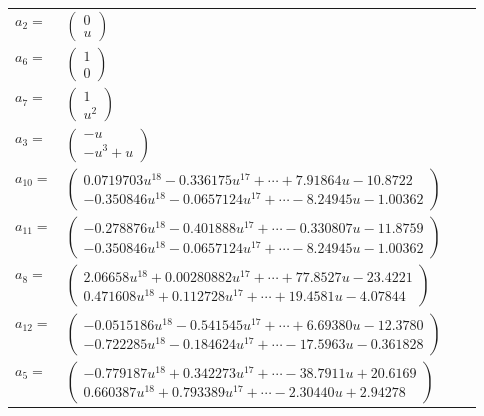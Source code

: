 \documentclass[1p]{elsarticle_modified}
\theoremstyle{definition}
\begin{document}
\begin{tabular}{m{7pt} m{180pt} m{7pt} m{180pt} }
\flushright $a_{2}=$&$\begin{pmatrix}0\\u\end{pmatrix}$ \\
\flushright $a_{6}=$&$\begin{pmatrix}1\\0\end{pmatrix}$ \\
\flushright $a_{7}=$&$\begin{pmatrix}1\\u^2\end{pmatrix}$ \\
\flushright $a_{3}=$&$\begin{pmatrix}- u\\- u^3+u\end{pmatrix}$ \\
\flushright $a_{10}=$&$\begin{pmatrix}0.0719703 u^{18}-0.336175 u^{17}+\cdots+7.91864 u-10.8722\\-0.350846 u^{18}-0.0657124 u^{17}+\cdots-8.24945 u-1.00362\end{pmatrix}$ \\
\flushright $a_{11}=$&$\begin{pmatrix}-0.278876 u^{18}-0.401888 u^{17}+\cdots-0.330807 u-11.8759\\-0.350846 u^{18}-0.0657124 u^{17}+\cdots-8.24945 u-1.00362\end{pmatrix}$ \\
\flushright $a_{8}=$&$\begin{pmatrix}2.06658 u^{18}+0.00280882 u^{17}+\cdots+77.8527 u-23.4221\\0.471608 u^{18}+0.112728 u^{17}+\cdots+19.4581 u-4.07844\end{pmatrix}$ \\
\flushright $a_{12}=$&$\begin{pmatrix}-0.0515186 u^{18}-0.541545 u^{17}+\cdots+6.69380 u-12.3780\\-0.722285 u^{18}-0.184624 u^{17}+\cdots-17.5963 u-0.361828\end{pmatrix}$ \\
\flushright $a_{5}=$&$\begin{pmatrix}-0.779187 u^{18}+0.342273 u^{17}+\cdots-38.7911 u+20.6169\\0.660387 u^{18}+0.793389 u^{17}+\cdots-2.30440 u+2.94278\end{pmatrix}$ \\

\end{tabular}
\end{document}
